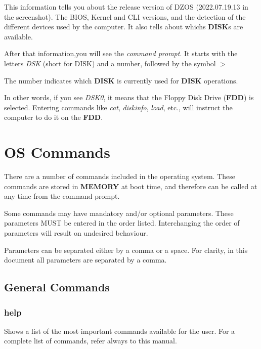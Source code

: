 \documentclass[a4paper,11pt]{article}
\begin{document}
    This information tells you about the release version of DZOS (2022.07.19.13
    in the screenshot). The BIOS, Kernel and CLI versions, and the detection of
    the different devices used by the computer. It also tells about whichs 
    \textbf{DISK}s are available.

    After that information,you will see the \textit{command prompt}. It starts
    with the letters \textit{DSK} (short for DISK) and a number, followed by the
    symbol $>$

    The number indicates which \textbf{DISK} is currently used for \textbf{DISK}
    operations.

    In other words, if you see \textit{DSK0}, it means that the Floppy Disk Drive
    (\textbf{FDD}) is selected. Entering commands like \textit{cat},
    \textit{diskinfo}, \textit{load}, etc., will instruct the computer to do it
    on the \textbf{FDD}.

    \pagebreak
    \section{OS Commands}
    There are a number of commands included in the operating system. These
    commands are stored in \textbf{MEMORY} at boot time, and therefore can be
    called at any time from the command prompt.

    Some commands may have mandatory and/or optional parameters. These
    parameters MUST be entered in the order listed. Interchanging the order of
    parameters will result on undesired behaviour.

    Parameters can be separated either by a comma or a space. For clarity, in
    this document all parameters are separated by a comma.

    \subsection{General Commands}\label{gencmds}
        \subsubsection{{\color{blue}help}}
        Shows a list of the most important commands available for the user.
        For a complete list of commands, refer always to this manual.
\end{document}
